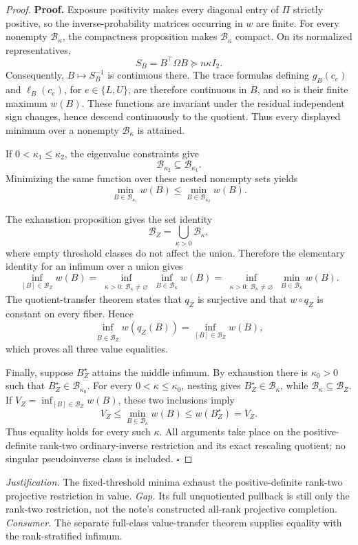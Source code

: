\documentclass{article}
\begin{document}
\begin{proof}
\textbf{Proof.}
Exposure positivity makes every diagonal entry of \(\Pi\) strictly positive, so the inverse-probability matrices occurring in \(w\) are finite.  For every nonempty \(\mathcal B_\kappa\), the compactness proposition makes \(\mathcal B_\kappa\) compact.  On its normalized representatives,
\[
 S_B=B^{\top}\Omega B\succeq n\kappa I_2.
\]
Consequently, \(B\mapsto S_B^{-1}\) is continuous there.  The trace formulas defining \(g_B(c_e)\) and \(\ell_B(c_e)\), for \(e\in\{L,U\}\), are therefore continuous in \(B\), and so is their finite maximum \(w(B)\).  These functions are invariant under the residual independent sign changes, hence descend continuously to the quotient.  Thus every displayed minimum over a nonempty \(\mathcal B_\kappa\) is attained.

If \(0<\kappa_1\le\kappa_2\), the eigenvalue constraints give
\[
 \mathcal B_{\kappa_2}\subseteq\mathcal B_{\kappa_1}.
\]
Minimizing the same function over these nested nonempty sets yields
\[
 \min_{B\in\mathcal B_{\kappa_1}}w(B)
 \le
 \min_{B\in\mathcal B_{\kappa_2}}w(B).
\]

The exhaustion proposition gives the set identity
\[
 \mathcal B_Z=\bigcup_{\kappa>0}\mathcal B_\kappa,
\]
where empty threshold classes do not affect the union.  Therefore the elementary identity for an infimum over a union gives
\[
 \inf_{[B]\in\mathcal B_Z}w(B)
 =
 \inf_{\substack{\kappa>0:\,\mathcal B_\kappa\ne\varnothing}}
 \inf_{B\in\mathcal B_\kappa}w(B)
 =
 \inf_{\substack{\kappa>0:\,\mathcal B_\kappa\ne\varnothing}}
 \min_{B\in\mathcal B_\kappa}w(B).
\tag{1}
\]
The quotient-transfer theorem states that \(q_Z\) is surjective and that \(w\circ q_Z\) is constant on every fiber.  Hence
\[
 \inf_{B\in\widetilde{\mathcal B}_Z}w(q_Z(B))
 =\inf_{[B]\in\mathcal B_Z}w(B),
\tag{2}
\]
which proves all three value equalities.

Finally, suppose \(B_Z^\star\) attains the middle infimum.  By exhaustion there is \(\kappa_0>0\) such that \(B_Z^\star\in\mathcal B_{\kappa_0}\).  For every \(0<\kappa\le\kappa_0\), nesting gives \(B_Z^\star\in\mathcal B_\kappa\), while \(\mathcal B_\kappa\subseteq\mathcal B_Z\).  If \(V_Z=\inf_{[B]\in\mathcal B_Z}w(B)\), these two inclusions imply
\[
 V_Z
 \le \min_{B\in\mathcal B_\kappa}w(B)
 \le w(B_Z^\star)
 =V_Z.
\]
Thus equality holds for every such \(\kappa\).  All arguments take place on the positive-definite rank-two ordinary-inverse restriction and its exact rescaling quotient; no singular pseudoinverse class is included. \(\square\)
\end{proof}
\par\smallskip\noindent \textit{Justification.} The fixed-threshold minima exhaust the positive-definite rank-two projective restriction in value. \textit{Gap.} Its full unquotiented pullback is still only the rank-two restriction, not the note's constructed all-rank projective completion. \textit{Consumer.} The separate full-class value-transfer theorem supplies equality with the rank-stratified infimum.
\end{document}

